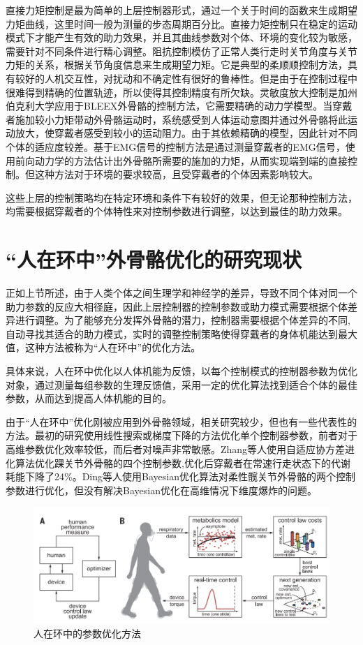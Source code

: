 直接力矩控制是最为简单的上层控制器形式，通过一个关于时间的函数来生成期望力矩曲线\cite{p32,p33}，这里时间一般为测量的步态周期百分比。直接力矩控制只在稳定的运动模式下才能产生有效的助力效果，并且其曲线参数对个体、环境的变化较为敏感，需要针对不同条件进行精心调整。阻抗控制模仿了正常人类行走时关节角度与关节力矩的关系，根据关节角度信息来生成期望力矩\cite{p34}。它是典型的柔顺顺控制方法，具有较好的人机交互性，对扰动和不确定性有很好的鲁棒性。但是由于在控制过程中很难得到精确的位置轨迹，所以使得其控制精度有所欠缺。灵敏度放大控制是加州伯克利大学应用于BLEEX外骨骼的控制方法\cite{p35}，它需要精确的动力学模型。当穿戴者施加较小力矩带动外骨骼运动时，系统感受到人体运动意图并通过外骨骼将此运动放大，使穿戴者感受到较小的运动阻力。由于其依赖精确的模型，因此针对不同个体的适应度较差。基于EMG信号的控制方法是通过测量穿戴者的EMG信号，使用前向动力学的方法估计出外骨骼所需要的施加的力矩，从而实现端到端的直接控制\cite{p36}。但这种方法对于环境的要求较高，且受穿戴者的个体因素影响较大。

这些上层的控制策略均在特定环境和条件下有较好的效果，但无论那种控制方法，均需要根据穿戴者的个体特性来对控制参数进行调整，以达到最佳的助力效果。

\section{“人在环中”外骨骼优化的研究现状}

正如上节所述，由于人类个体之间生理学和神经学的差异，导致不同个体对同一个助力参数的反应大相径庭\cite{p37}，因此上层控制器的控制参数或助力模式需要根据个体差异进行调整。为了能够充分发挥外骨骼的潜力，控制器需要根据个体差异的不同,自动寻找其适合的助力模式，实时的调整控制策略使得穿戴者的身体机能达到最大值，这种方法被称为“人在环中”的优化方法\cite{p38}。

具体来说，人在环中优化以人体机能为反馈，以每个控制模式的控制器参数为优化对象，通过测量每组参数的生理反馈值，采用一定的优化算法找到适合个体的最佳参数，从而达到提高人体机能的目的。

由于“人在环中”优化刚被应用到外骨骼领域，相关研究较少，但也有一些代表性的方法。最初的研究使用线性搜索\cite{p38}或梯度下降\cite{p39}的方法优化单个控制器参数，前者对于高维参数优化效率较低，而后者对噪声非常敏感。Zhang等人使用自适应协方差进化算法优化踝关节外骨骼的四个控制参数\cite{p40},优化后穿戴者在常速行走状态下的代谢耗能下降了24\%。Ding等人使用Bayesian优化算法对柔性髋关节外骨骼的两个控制参数进行优化\cite{p41}，但没有解决Bayesian优化在高维情况下维度爆炸的问题。

\begin{figure}[htb]
    \includegraphics[width=15cm]{fig/f18.jpg}
    \caption{人在环中的参数优化方法\cite{p40}}
    \label{fig:mark}
\end{figure}

